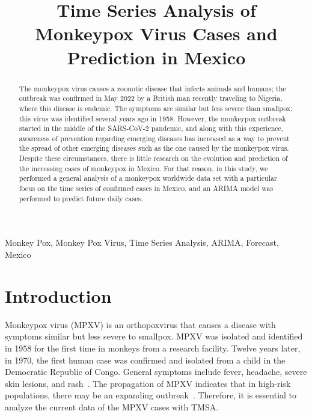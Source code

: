 \documentclass[conference]{IEEEtran}
\begin{document}
\title{Time Series Analysis of Monkeypox Virus Cases and Prediction in Mexico\\
}

\author{
\and
{}
}

\maketitle

\begin{abstract}
The monkeypox virus causes a zoonotic disease that infects animals and humans; the outbreak was confirmed in May 2022 by a British man recently traveling to Nigeria, where this disease is endemic. The symptoms are similar but less severe than smallpox; this virus was identified several years ago in 1958. However, the monkeypox outbreak started in the middle of the SARS-CoV-2 pandemic, and along with this experience, awareness of prevention regarding emerging diseases has increased as a way to prevent the spread of other emerging diseases such as the one caused by the monkeypox virus. Despite these circumstances, there is little research on the evolution and prediction of the increasing cases of monkeypox in Mexico. For that reason, in this study, we performed a general analysis of a monkeypox worldwide data set with a particular focus on the time series of confirmed cases in Mexico, and an ARIMA model was performed to predict future daily cases.
\end{abstract}

\begin{IEEEkeywords}
Monkey Pox, Monkey Pox Virus, Time Series Analysis, ARIMA, Forecast, Mexico 
\end{IEEEkeywords}

\section{Introduction}
Monkeypox virus (MPXV) is an orthopoxvirus that causes a disease with symptoms similar but less severe to smallpox. MPXV was isolated and identified in 1958 for the first time in monkeys from a research facility. Twelve years later, in 1970, the first human case was confirmed and isolated from a child in the Democratic Republic of Congo. General symptoms include fever, headache, severe skin lesions, and rash~\cite{Moore2022}. The propagation of MPXV indicates that in high-risk populations, there may be an expanding outbreak~\cite{Cicozzi2022}. Therefore, it is essential to analyze the current data of the MPXV cases with TMSA. 
\end{document}
